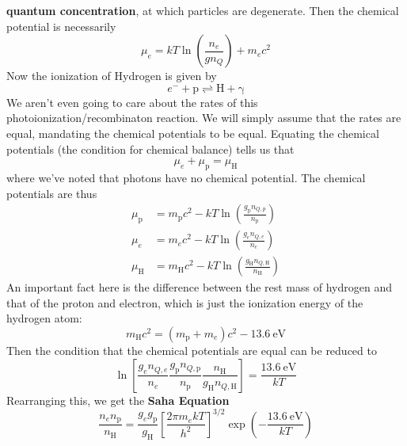 \documentclass[10pt]{article}
\numberwithin{equation}{section}
\begin{document}
    \textbf{quantum concentration}, at which particles are degenerate. Then the
    chemical potential is necessarily
    \begin{equation}
      \label{eq:202}
      \boxed{\mu_e=kT\ln\left(\frac{n_e}{gn_Q}\right)+m_ec^2}
    \end{equation}
    Now the ionization of Hydrogen is given by
    \begin{equation}
      \label{eq:203}
      e^{-}+\mathrm{p\rightleftharpoons H+\gamma}
    \end{equation}
    We aren't even going to care about the rates of this
    photoionization/recombinaton reaction. We will simply assume that the rates
    are equal, mandating the chemical potentials to be equal. Equating the
    chemical potentials (the condition for chemical balance) tells us that
    \begin{equation}
      \label{eq:204}
      \mu_e+\mu_\mathrm{p}=\mu_\mathrm{H}
    \end{equation}
    where we've noted that photons have no chemical potential. The
    chemical potentials are thus
    \begin{align}
      \label{eq:205}
      \mu_\mathrm{p} &=
      m_\mathrm{p}c^2-kT\ln\left(\frac{g_\mathrm{p}n_{Q,p}}{n_{\mathrm
{p}}}\right)\\
      \label{eq:205a}
      \mu_e &= m_ec^2-kT\ln\left(\frac{g_e n_{Q,e}}{n_e}\right)\\
      \label{eq:205b}
      \mu_\mathrm{H} &=
      m_\mathrm{H}c^2-kT\ln\left(\frac{g_\mathrm{H}n_{Q,\mathrm{H}}}{n_{\mathrm
{H}}}\right)
    \end{align}
    An important fact here is the difference between the rest mass of
    hydrogen and that of the proton and electron, which is just the
    ionization energy of the hydrogen atom:
    \begin{equation}
      \label{eq:206}
      m_\mathrm{H}c^2=(m_\mathrm{p}+m_e)c^2-13.6\ \mathrm{eV}
    \end{equation}
    Then the condition that the chemical potentials are equal can be
    reduced to
    \begin{equation}
      \label{eq:207}
      \ln\left[\frac{g_e n_{Q,e}}{n_e}\frac{g_{\mathrm{p}}
          n_{Q,\mathrm{p}}}{n_{\mathrm{p}}}\frac{n_{\mathrm{H}}}{g_
{\mathrm{H}}
          n_{Q,\mathrm{H}}}\right]=\frac{13.6\ \mathrm{eV}}{kT}
    \end{equation}
    Rearranging this, we get the \textbf{Saha Equation}
    \begin{equation}
      \label{eq:208}
    \boxed{\frac{n_en_{\mathrm{p}}}{n_\mathrm{H}} =
    \frac{g_eg_\mathrm{p}}{g_{\mathrm{ H}}} \left[\frac{2\pi
    m_ekT}{h^2}\right]^{3/2} \exp\left( -\frac{13.6\ \mathrm{eV}}{kT} \right)}
    \end{equation}
\end{document}
